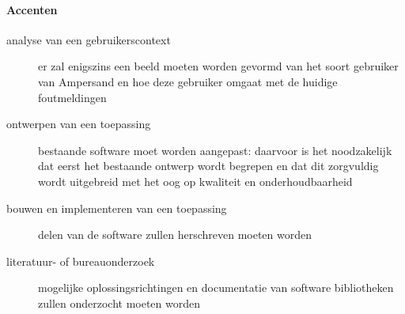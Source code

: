 \paragraph{Accenten}
\begin{description}
\item[analyse van een gebruikerscontext] er zal enigszins een beeld moeten worden gevormd van het soort gebruiker van Ampersand en hoe deze gebruiker omgaat met de huidige foutmeldingen
\item[ontwerpen van een toepassing] bestaande software moet worden aangepast: daarvoor is het noodzakelijk dat eerst het bestaande ontwerp wordt begrepen en dat dit zorgvuldig wordt uitgebreid met het oog op kwaliteit en onderhoudbaarheid
\item[bouwen en implementeren van een toepassing] delen van de software zullen herschreven moeten worden
\item[literatuur- of bureauonderzoek] mogelijke oplossingsrichtingen en documentatie van software bibliotheken zullen onderzocht moeten worden
\end{description}


